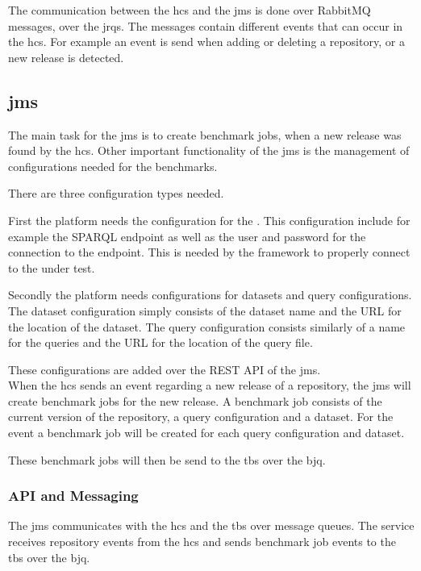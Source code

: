 The communication between the \ac{hcs} and the \acl{jms} is done over RabbitMQ messages, over the \aclp{jrq}.
The messages contain different events that can occur in the \ac{hcs}.
For example an event is send when adding or deleting a repository, or a new release is detected.


\subsection{\acl{jms}}
\label{sec:jobs_managing_service}
The main task for the \acf{jms} is to create benchmark jobs, when a new release was found by the \ac{hcs}.
Other important functionality of the \ac{jms} is the management of configurations needed for the benchmarks.

There are three configuration types needed.

First the platform needs the configuration for the \ts{}.
This configuration include for example the SPARQL endpoint as well as the user and password for the connection to the endpoint.
This is needed by the \iguana{} framework to properly connect to the \ts{} under test\cite{IguanaDocumentationConfiguration}.

Secondly the platform needs configurations for datasets and query configurations.
The dataset configuration simply consists of the dataset name and the URL for the location of the dataset.
The query configuration consists similarly of a name for the queries and the URL for the location of the query file.

These configurations are added over the REST API of the \ac{jms}.
\\

When the \ac{hcs} sends an event regarding a new release of a repository, the \ac{jms} will create benchmark jobs for the new release.
A benchmark job consists of the current version of the repository, a query configuration and a dataset.
For the event a benchmark job will be created for each query configuration and dataset.

These benchmark jobs will then be send to the \acl{tbs} over the \acl{bjq}.


\subsubsection{API and Messaging}
\label{sec:jobs_api}
The \ac{jms} communicates with the \ac{hcs} and the \acl{tbs} over message queues.
The service receives repository events from the \ac{hcs} and sends benchmark job events to the \acl{tbs} over the \ac{bjq}.
\\


